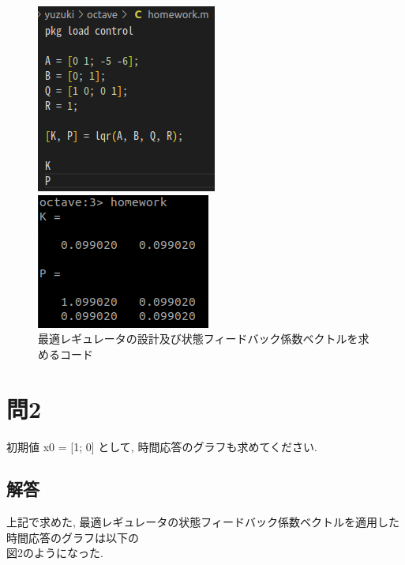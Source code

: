 \documentclass{jsarticle}
\begin{document}
\begin{figure}[htbp]
  \begin{minipage}[t]{0.5\linewidth}
    \centering
    \includegraphics[keepaspectratio, scale=0.65]{fig/2.png}
  \end{minipage}
  \begin{minipage}[t]{0.5\linewidth}
    \centering
    \includegraphics[keepaspectratio, scale=0.90]{fig/1.png}
  \end{minipage}\vspace*{2mm}
  \caption{最適レギュレータの設計及び状態フィードバック係数ベクトルを求めるコード}
\end{figure}



\vspace*{1mm}\section*{問2}
初期値 x0 = [1; 0] として, 時間応答のグラフも求めてください.\\

\vspace*{4mm}\subsection*{解答}
上記で求めた, 最適レギュレータの状態フィードバック係数ベクトルを適用した時間応答のグラフは以下の\\
\hspace*{1zw}図2のようになった.\\
\end{document}
